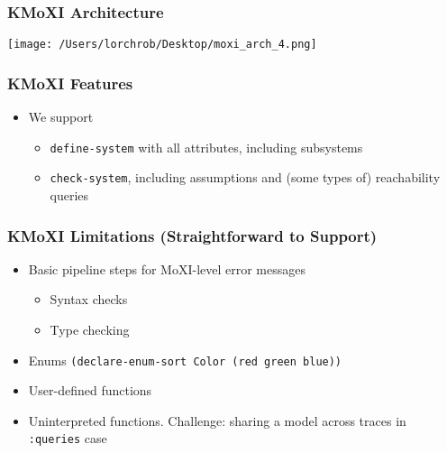 \documentclass[11pt,xcolor={dvipsnames},hyperref={pdftex,pdfpagemode=UseNone,hidelinks,pdfdisplaydoctitle=true},usepdftitle=false]{beamer}
\newcommand{\code}[1]{{\footnotesize\texttt{#1}}}
\begin{document}
\begin{frame} 
    \frametitle{KMoXI Architecture}
    \texttt{[image: /Users/lorchrob/Desktop/moxi\_arch\_4.png]}
\end{frame}


\begin{frame}
    \frametitle{KMoXI Features}
    \begin{itemize}
        \item We support
        \begin{itemize}
            \item \code{define-system} with all attributes, including subsystems
            \item \code{check-system}, including assumptions and (some types of) reachability queries
        \end{itemize}
    \end{itemize}
\end{frame} 

\begin{frame}
    \frametitle{KMoXI Limitations (Straightforward to Support)}
    \begin{itemize}
        \item Basic pipeline steps for MoXI-level error messages
        \begin{itemize}
            \item Syntax checks 
            \item Type checking
        \end{itemize} 
        \pause
        \item Enums \newline 
        {\footnotesize \texttt{(declare-enum-sort Color (red green blue))}}
        \pause
        \item User-defined functions
        \item Uninterpreted functions. Challenge: sharing a model across traces in \code{:queries} case
    \end{itemize}
\end{frame}
\end{document}
